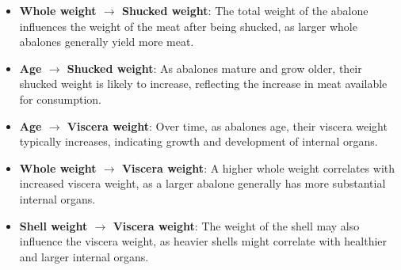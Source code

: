 \documentclass{article}
\begin{document}
\begin{minipage}[t]{0.7\linewidth}
\begin{itemize}
    \item \textbf{Whole weight $\rightarrow$ Shucked weight}: The total weight of the abalone influences the weight of the meat after being shucked, as larger whole abalones generally yield more meat.
    
    \item \textbf{Age $\rightarrow$ Shucked weight}: As abalones mature and grow older, their shucked weight is likely to increase, reflecting the increase in meat available for consumption.
    
    \item \textbf{Age $\rightarrow$ Viscera weight}: Over time, as abalones age, their viscera weight typically increases, indicating growth and development of internal organs.
    
    \item \textbf{Whole weight $\rightarrow$ Viscera weight}: A higher whole weight correlates with increased viscera weight, as a larger abalone generally has more substantial internal organs.
    
    \item \textbf{Shell weight $\rightarrow$ Viscera weight}: The weight of the shell may also influence the viscera weight, as heavier shells might correlate with healthier and larger internal organs.
\end{itemize}
\end{minipage}
\hspace{0.05\textwidth}
\end{document}

